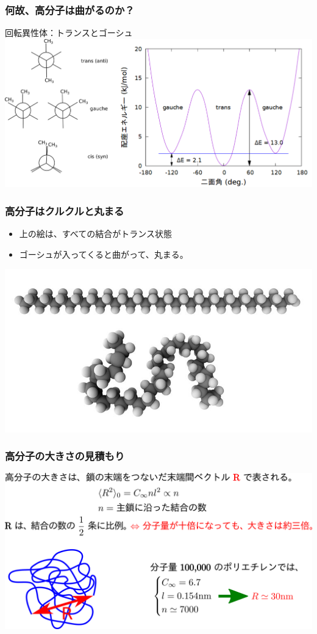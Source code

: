 \documentclass[12pt, dvipdfmx]{beamer}
\begin{document}
\begin{frame}
	\frametitle{何故、高分子は曲がるのか？}
	回転異性体：トランスとゴーシュ
	\vspace{5mm}
	\centering
	\includegraphics[width=\textwidth]{butane.png}
\end{frame}

\begin{frame}
	\frametitle{高分子はクルクルと丸まる}
	\begin{itemize}
		\item 上の絵は、すべての結合がトランス状態
		\item ゴーシュが入ってくると曲がって、丸まる。
	\end{itemize}
	\centering
	\includegraphics[width=\textwidth]{PE.jpg}
\end{frame}

\begin{frame}
	\frametitle{高分子の大きさの見積もり}
	\centering
	\includegraphics[width=\textwidth]{polymer_R.png}
\end{frame}
\end{document}
